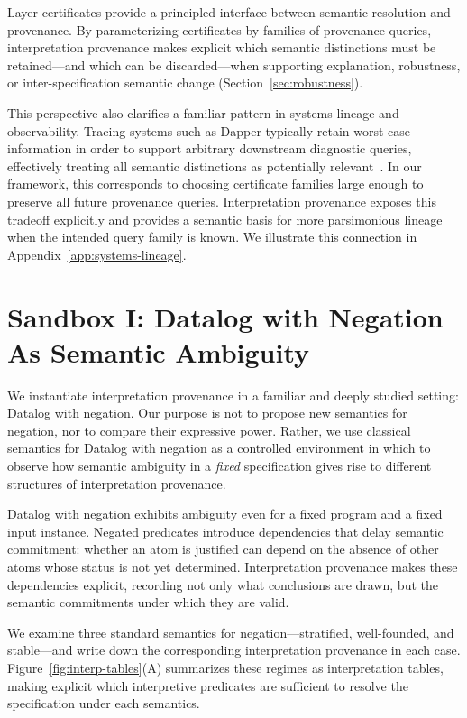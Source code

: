 \documentclass[acmsmall,nonacm]{acmart}
\theoremstyle{remark}
\numberwithin{definition}{section}
\numberwithin{theorem}{section}
\numberwithin{lemma}{section}
\numberwithin{corollary}{section}
\numberwithin{remark}{section}
\numberwithin{example}{section}
\numberwithin{observation}{section}
\numberwithin{assumption}{section}
\begin{document}
Layer certificates provide a principled interface between semantic resolution and
provenance.
By parameterizing certificates by families of provenance queries,
interpretation provenance makes explicit which semantic distinctions must be
retained—and which can be discarded—when supporting explanation, robustness, or
inter-specification semantic change (Section~\ref{sec:robustness}).

This perspective also clarifies a familiar pattern in systems lineage and
observability.
Tracing systems such as Dapper typically retain worst-case information in order to
support arbitrary downstream diagnostic queries, effectively treating all
semantic distinctions as potentially relevant~\cite{sigelman2010dapper}.
In our framework, this corresponds to choosing certificate families large enough
to preserve all future provenance queries.
Interpretation provenance exposes this tradeoff explicitly and provides a semantic
basis for more parsimonious lineage when the intended query family is known.
We illustrate this connection in Appendix~\ref{app:systems-lineage}.

\section{Sandbox I: Datalog with Negation As Semantic Ambiguity}
\label{sec:negation}

We instantiate interpretation provenance in a familiar and deeply studied
setting: Datalog with negation.
Our purpose is not to propose new semantics for negation, nor to compare their
expressive power.
Rather, we use classical semantics for Datalog with negation as a controlled
environment in which to observe how semantic ambiguity in a \emph{fixed}
specification gives rise to different structures of interpretation provenance.

Datalog with negation exhibits ambiguity even for a fixed program and a fixed
input instance.
Negated predicates introduce dependencies that delay semantic commitment: whether
an atom is justified can depend on the absence of other atoms whose status is not
yet determined.
Interpretation provenance makes these dependencies explicit, recording not only
what conclusions are drawn, but the semantic commitments under which they are
valid.

We examine three standard semantics for negation—stratified, well-founded, and
stable—and write down the corresponding interpretation provenance in each case.
Figure~\ref{fig:interp-tables}(A) summarizes these regimes as interpretation tables,
making explicit which interpretive predicates are sufficient to resolve the
specification under each semantics.
\end{document}
